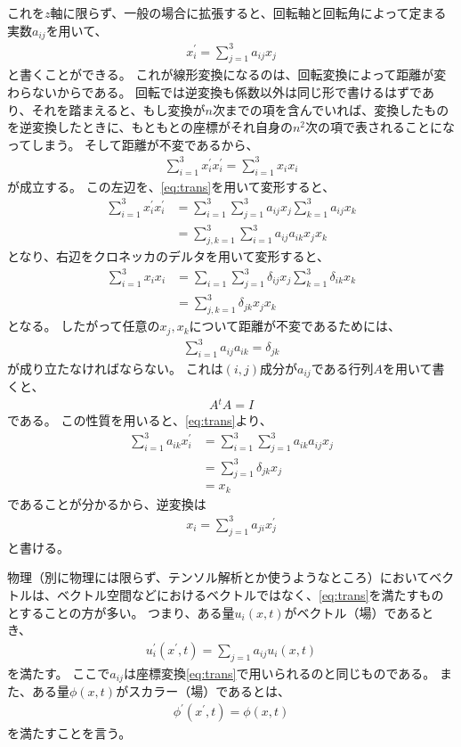 \documentclass[a4paper]{jsarticle}
\begin{document}
これを$z$軸に限らず、一般の場合に拡張すると、回転軸と回転角によって定まる実数$a_{ij}$を用いて、
\begin{align}
	x_i^{\prime} = \sum_{j=1}^3 a_{ij} x_j \label{eq:trans}
\end{align}
と書くことができる。
これが線形変換になるのは、回転変換によって距離が変わらないからである。
回転では逆変換も係数以外は同じ形で書けるはずであり、それを踏まえると、もし変換が$n$次までの項を含んでいれば、変換したものを逆変換したときに、もともとの座標がそれ自身の$n^2$次の項で表されることになってしまう。
そして距離が不変であるから、
\begin{align}
	\sum_{i=1}^3 x_i^{\prime} x_i^{\prime} = \sum_{i=1}^3 x_i x_i
\end{align}
が成立する。
この左辺を、\eqref{eq:trans}を用いて変形すると、
\begin{align}
	\sum_{i=1}^3 x_i^{\prime} x_i^{\prime}
	&= \sum_{i=1}^3 \sum_{j=1}^3 a_{ij}x_j \sum_{k=1}^3 a_{ij} x_k \\
	&= \sum_{j, k = 1}^3 \sum_{i=1}^3 a_{ij}a_{ik} x_j x_k
\end{align}
となり、右辺をクロネッカのデルタを用いて変形すると、
\begin{align}
	\sum_{i=1}^3 x_i x_i 
	&= \sum_{i=1} \sum_{j=1}^3 \delta_{ij} x_j \sum_{k=1}^3 \delta_{ik} x_k \\
	&= \sum_{j, k=1}^3 \delta_{jk} x_j x_k
\end{align}
となる。
したがって任意の$x_j, x_k$について距離が不変であるためには、
\begin{align}
	\sum_{i=1}^3 a_{ij} a_{ik} = \delta_{jk}
\end{align}
が成り立たなければならない。
これは$(i, j)$成分が$a_{ij}$である行列$A$を用いて書くと、
\begin{align}
	A {}^t\!A = I
\end{align}
である。
この性質を用いると、\eqref{eq:trans}より、
\begin{align}
	\sum_{i=1}^3 a_{ik} x_i^{\prime}
	&= \sum_{i=1}^3 \sum_{j=1}^3 a_{ik} a_{ij} x_j \\
	&= \sum_{j=1}^3 \delta_{jk} x_j \\
	&= x_k
\end{align}
であることが分かるから、逆変換は
\begin{align}
	x_i = \sum_{j=1}^3 a_{ji} x^{\prime}_j \label{eq:transRev}
\end{align}
と書ける。

物理（別に物理には限らず、テンソル解析とか使うようなところ）においてベクトルは、ベクトル空間などにおけるベクトルではなく、\eqref{eq:trans}を満たすものとすることの方が多い。
つまり、ある量$u_i(x, t)$がベクトル（場）であるとき、
\begin{align}
	u_i^{\prime} (x^{\prime}, t) = \sum_{j=1} a_{ij} u_i (x, t) \label{eq:vector}
\end{align}
を満たす。
ここで$a_{ij}$は座標変換\eqref{eq:trans}で用いられるのと同じものである。
また、ある量$\phi(x, t)$がスカラー（場）であるとは、
\begin{align}
	\phi^{\prime}(x^{\prime}, t) = \phi(x, t) \label{eq:scholor}
\end{align}
を満たすことを言う。
\end{document}
